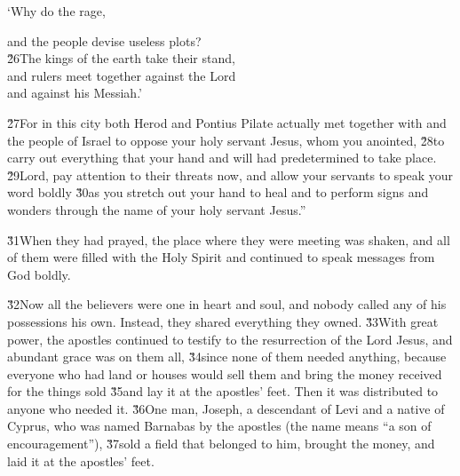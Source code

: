 `Why do the  rage,

\begin{poetry}
\poemll    and the people devise useless plots? \\
\poeml \v{26}The kings of the earth take their stand, \\
\poemll    and rulers meet together against the Lord \\
\poemlll       and against his Messiah.'
\end{poetry}

\v{27}For in this city both Herod and Pontius Pilate actually met together with  and the people of Israel to oppose your holy servant Jesus, whom you anointed, \v{28}to carry out everything that your hand and will had predetermined to take place. \v{29}Lord, pay attention to their threats now, and allow your servants to speak your word boldly \v{30}as you stretch out your hand to heal and to perform signs and wonders through the name of your holy servant Jesus.''

\v{31}When they had prayed, the place where they were meeting was shaken, and all of them were filled with the Holy Spirit and continued to speak messages from God boldly.

\v{32}Now all the believers were one in heart and soul, and nobody called any of his possessions his own. Instead, they shared everything they owned. \v{33}With great power, the apostles continued to testify to the resurrection of the Lord Jesus, and abundant grace was on them all, \v{34}since none of them needed anything, because everyone who had land or houses would sell them and bring the money received for the things sold \v{35}and lay it at the apostles' feet. Then it was distributed to anyone who needed it. \v{36}One man, Joseph, a descendant of Levi and a native of Cyprus, who was named Barnabas by the apostles (the name means ``a son of encouragement''), \v{37}sold a field that belonged to him, brought the money, and laid it at the apostles' feet.

